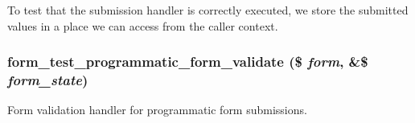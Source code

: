 To test that the submission handler is correctly executed, we store the submitted values in a place we can access from the caller context. \hypertarget{form__test_8module_ac397894097fd2b6cbb39612c6c124b93}{
\subsubsection[{form\_\-test\_\-programmatic\_\-form\_\-validate}]{\setlength{\rightskip}{0pt plus 5cm}form\_\-test\_\-programmatic\_\-form\_\-validate (\$ {\em form}, \/  \&\$ {\em form\_\-state})}}
\label{form__test_8module_ac397894097fd2b6cbb39612c6c124b93}
Form validation handler for programmatic form submissions.

